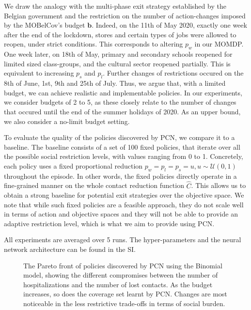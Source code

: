 \documentclass{article}
\newcommand{\momdpname}{MOBelCov}
\newcommand{\budget}{\bm{b}}
\begin{document}
We draw the analogy with the multi-phase exit strategy established by the Belgian government and the restriction on the number of action-changes imposed by the \momdpname's budget $\budget$. Indeed, on the 11th of May 2020, exactly one week after the end of the lockdown, stores and certain types of jobs were allowed to reopen, under strict conditions. This corresponds to altering $p_w$ in our MOMDP. One week later, on 18th of May, primary and secondary schools reopened for limited sized class-groups, and the cultural sector reopened partially. This is equivalent to increasing $p_s$ and $p_l$. Further changes of restrictions occured on the 8th of June, 1st, 9th and 25th of July. Thus, we argue that, with a limited budget, we can achieve realistic and implementable policies. In our experiments, we consider budgets of 2 to 5, as these closely relate to the number of changes that occured until the end of the summer holidays of 2020. As an upper bound, we also consider a no-limit budget setting.

To evaluate the quality of the policies discovered by PCN, we compare it to a baseline. The baseline consists of a set of 100 fixed policies, that iterate over all the possible social restriction levels, with values ranging from 0 to 1. Concretely, each policy uses a fixed proportional reduction $p_w=p_l=p_s=u, u\sim\mathcal{U}(0, 1)$ throughout the episode. In other words, the fixed policies directly operate in a fine-grained manner on the whole contact reduction function $\hat{C}$. This allows us to obtain a strong baseline for potential exit strategies over the objective space. We note that while such fixed policies are a feasible approach, they do not scale well in terms of action and objective spaces and they will not be able to provide an adaptive restriction level, which is what we aim to provide using PCN.

All experiments are averaged over 5 runs. The hyper-parameters and the neural network architecture can be found in the SI.

\begin{figure}
    \centering
    
    \caption{The Pareto front of policies discovered by PCN using the Binomial model, showing the different compromises between the number of hospitalizations and the number of lost contacts. As the budget increases, so does the coverage set learnt by PCN. Changes are most noticeable in the less restrictive trade-offs in terms of social burden.}
    \label{fig:pf-binomal-arh-budgets}
\end{figure}
\end{document}
